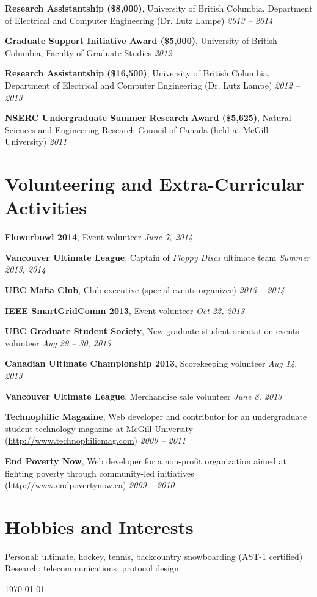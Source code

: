 \documentclass[letterpaper]{article}
\newcommand{\itemdescription}[3]{
  \textbf{#1}, {#2} \hfill \emph{#3}\\
  \medskip
}
\begin{document}
\itemdescription{Research Assistantship (\$8,000)}{University of British
Columbia, Department of Electrical and Computer Engineering (Dr. Lutz
Lampe)}{2013 -- 2014}

\itemdescription{Graduate Support Initiative Award (\$5,000)}{University of
British Columbia, Faculty of Graduate Studies}{2012}

\itemdescription{Research Assistantship (\$16,500)}{University of British
Columbia, Department of Electrical and Computer Engineering (Dr. Lutz
Lampe)}{2012 -- 2013}

\itemdescription{NSERC Undergraduate Summer Research Award (\$5,625)}{Natural 
Sciences and Engineering Research Council of Canada (held at McGill
University)}{2011}
\bigskip

\section*{Volunteering and Extra-Curricular Activities}
\itemdescription{Flowerbowl 2014}{Event volunteer}{June 7, 2014}

\itemdescription{Vancouver Ultimate League}{Captain of \emph{Floppy Discs}
ultimate team}{Summer 2013, 2014}

\itemdescription{UBC Mafia Club}{Club executive (special events organizer)}{2013
-- 2014}

\itemdescription{IEEE SmartGridComm 2013}{Event volunteer}{Oct 22,
2013}

\itemdescription{UBC Graduate Student Society}{New graduate student orientation
events volunteer}{Aug 29 -- 30, 2013}

\itemdescription{Canadian Ultimate Championship
2013}{Scorekeeping volunteer}{Aug 14, 2013}

\itemdescription{Vancouver Ultimate League}{Merchandise
sale volunteer}{June 8, 2013}

\itemdescription{Technophilic Magazine}{Web developer and contributor for an
undergraduate student technology magazine at McGill University
(\url{http://www.technophilicmag.com})}{2009 -- 2011}

\itemdescription{End Poverty Now}{Web developer for a non-profit organization 
aimed at fighting poverty through community-led initiatives
(\url{http://www.endpovertynow.ca})}{2009 -- 2010}
\bigskip

\section*{Hobbies and Interests}
Personal: ultimate, hockey, tennis, backcountry snowboarding (AST-1 certified)
\\
Research: telecommunications, protocol design

\vfill \hfill \monthyeardate\today
\end{document}
